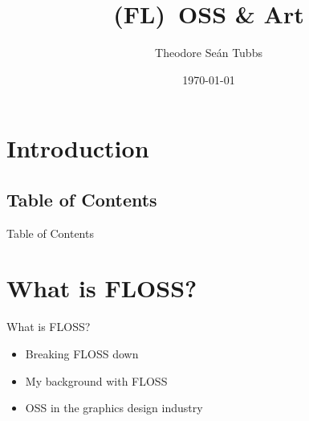 \documentclass[xcolor=svgnames,handout]{beamer}
\title[FAA\hspace{2em}]{(FL)~OSS \& Art}
\author[Theodore Se\'{a}n Tubbs]{Theodore Se\'{a}n Tubbs}
\date{\today}
\institute{DCMO BOCES}
\begin{document}
\maketitle

\section{Introduction}
\subsection{Table of Contents}
\begin{frame}
  {Table of Contents}

\tableofcontents

%
\end{frame}



\section{What is FLOSS?}

\begin{frame}
	{What is FLOSS?}
	\begin{itemize}
		\item Breaking FLOSS down
		\item My background with FLOSS
		\item OSS in the graphics design industry
	\end{itemize}

\end{frame}
\end{document}
